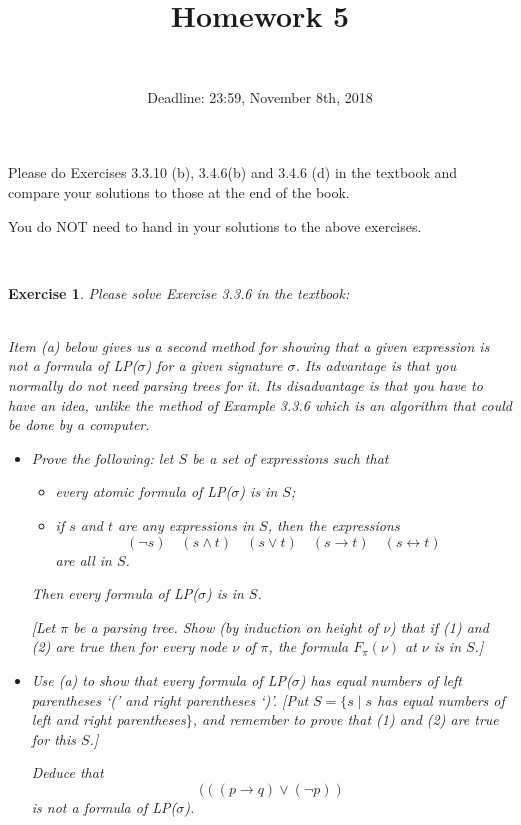 \documentclass[12pt,a4paper]{article}
\title{Homework 5}
\author{\\
}
\date{Deadline: 23:59, November 8th, 2018}
\theoremstyle{plain}
\newtheorem{exercise}{Exercise}
\begin{document}
\maketitle

Please do Exercises 3.3.10 (b), 3.4.6(b) and 3.4.6 (d) in the textbook and compare your solutions to those at the end of the book.

You do NOT need to hand in your solutions to the above exercises.

\ \\
\begin{exercise}
Please solve Exercise 3.3.6 in the textbook:

\ \\
Item (a) below gives us a second method for showing that a given expression is not a formula of LP($\sigma$) for a given signature $\sigma$.
Its advantage is that you normally do not need parsing trees for it. 
Its disadvantage is that you have to have an idea, unlike the method of Example 3.3.6 which is an algorithm that could be done by a computer.
%
\begin{itemize}

\item[(a)] Prove the following: let $S$ be a set of expressions such that 
%
\begin{itemize}

\item[(1)] every atomic formula of LP($\sigma$) is in $S$;

\item[(2)] if $s$ and $t$ are any expressions in $S$, then the expressions
%
\[
(\neg s) \quad (s \wedge t) \quad (s \vee t) \quad (s \rightarrow t) \quad (s \leftrightarrow t)
\]
%
are all in $S$.

\end{itemize} 
%
Then every formula of LP($\sigma$) is in $S$.

[Let $\pi$ be a parsing tree. 
Show (by induction on height of $\nu$) that if (1) and (2) are true then for every node $\nu$ of $\pi$, the formula $F_\pi (\nu)$ at $\nu$ is in $S$.]

\item[(b)] Use (a) to show that every formula of LP($\sigma$) has equal numbers of left parentheses `(' and right parentheses `)'. 
[Put $S = \{s \mid s$ has equal numbers of left and right parentheses$\}$, and remember to prove that (1) and (2) are true for this $S$.] 

Deduce that
%
\[
(((p \rightarrow q) \vee (\neg p))
\]
%
is not a formula of LP($\sigma$).

\end{itemize}
\end{exercise}
\end{document}
